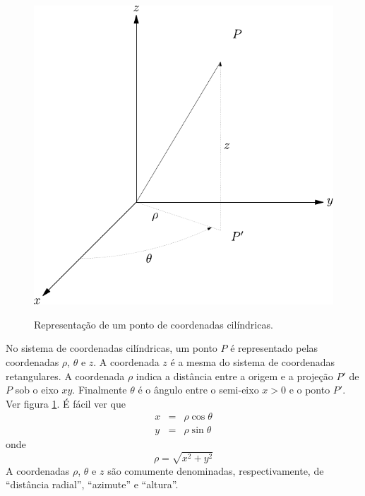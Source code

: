 \begin{figure}%
\begin{center}
   \includegraphics{./cap_algvet/figs/coordenadas_cilindricas}
   \caption{Representação de um ponto de coordenadas cilíndricas.}\label{Coo_cil}   
      \label{fig:coordenadas_cilindricas}
      \end{center}
  \end{figure}


No sistema de coordenadas cilíndricas, um ponto $P$ é representado pelas coordenadas $\rho$, $\theta$ e $z$. A coordenada $z$ é a mesma do sistema de coordenadas retangulares. A coordenada $\rho$ indica a distância entre a origem e a projeção $P'$ de $P$ sob o eixo $xy$. Finalmente $\theta$ é o ângulo entre o semi-eixo $x>0$ e o ponto $P'$. Ver figura \ref{fig:coordenadas_cilindricas}. É fácil ver que
\begin{subequations}\label{xphi}
\begin{eqnarray}
x&=&\rho\cos\theta\\
y&=&\rho\sin\theta
\end{eqnarray}  
\end{subequations}
onde
\begin{equation}
\rho=\sqrt{x^2+y^2}
\end{equation}
A coordenadas $\rho$, $\theta$ e $z$ são comumente denominadas, respectivamente, de ``distância radial'', ``azimute'' e ``altura''. 


